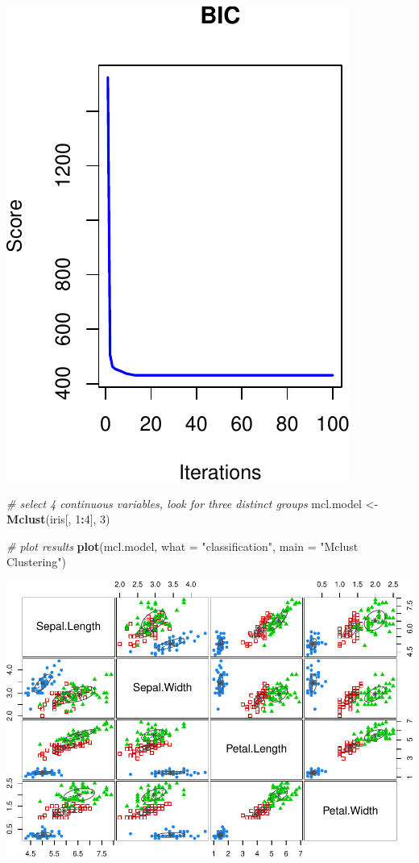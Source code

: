 \documentclass[12pt]{article}
\newenvironment{Shaded}{\begin{snugshade}}{\end{snugshade}}
\newcommand{\AttributeTok}[1]{\textcolor[rgb]{0.13,0.29,0.53}{#1}}
\newcommand{\CommentTok}[1]{\textcolor[rgb]{0.56,0.35,0.01}{\textit{#1}}}
\newcommand{\DecValTok}[1]{\textcolor[rgb]{0.00,0.00,0.81}{#1}}
\newcommand{\FunctionTok}[1]{\textcolor[rgb]{0.13,0.29,0.53}{\textbf{#1}}}
\newcommand{\NormalTok}[1]{#1}
\newcommand{\OtherTok}[1]{\textcolor[rgb]{0.56,0.35,0.01}{#1}}
\newcommand{\SpecialCharTok}[1]{\textcolor[rgb]{0.81,0.36,0.00}{\textbf{#1}}}
\newcommand{\StringTok}[1]{\textcolor[rgb]{0.31,0.60,0.02}{#1}}
\begin{document}
\includegraphics{CassieJin_FinalPaper_files/figure-latex/unnamed-chunk-7-1.pdf}

\begin{Shaded}
\begin{Highlighting}[]
\CommentTok{\# select 4 continuous variables, look for three distinct groups}
\NormalTok{mcl.model }\OtherTok{\textless{}{-}} \FunctionTok{Mclust}\NormalTok{(iris[, }\DecValTok{1}\SpecialCharTok{:}\DecValTok{4}\NormalTok{], }\DecValTok{3}\NormalTok{)}

\CommentTok{\# plot results}
\FunctionTok{plot}\NormalTok{(mcl.model, }\AttributeTok{what =} \StringTok{"classification"}\NormalTok{, }\AttributeTok{main =} \StringTok{"Mclust Clustering"}\NormalTok{)}
\end{Highlighting}
\end{Shaded}

\includegraphics{CassieJin_FinalPaper_files/figure-latex/unnamed-chunk-8-1.pdf}
\end{document}
